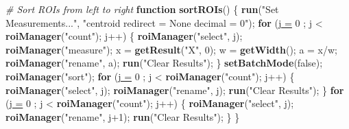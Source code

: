 \documentclass[11pt,singlespacinge,twoside]{reedthesis} %
\newenvironment{Shaded}{}{}
\newcommand{\CommentTok}[1]{\textit{#1}}
\newcommand{\ControlFlowTok}[1]{\textbf{#1}}
\newcommand{\DataTypeTok}[1]{\underline{#1}}
\newcommand{\DecValTok}[1]{#1}
\newcommand{\KeywordTok}[1]{\textbf{#1}}
\newcommand{\NormalTok}[1]{#1}
\newcommand{\OperatorTok}[1]{#1}
\newcommand{\StringTok}[1]{#1}
\theoremstyle{definition}
\theoremstyle{definition}
\theoremstyle{definition}
\theoremstyle{remark}
\begin{document}
\scriptsize
\begin{Shaded}
\begin{Highlighting}[numbers=left,,]
\CommentTok{# Sort ROIs from left to right}
\ControlFlowTok{function} \KeywordTok{sortROIs}\NormalTok{() \{}
    \KeywordTok{run}\NormalTok{(}\StringTok{"Set Measurements..."}\NormalTok{, }\StringTok{"centroid redirect = None decimal = 0"}\NormalTok{);}
            \ControlFlowTok{for}\NormalTok{ (}\DataTypeTok{j =} \DecValTok{0}\NormalTok{ ; j }\OperatorTok{<}\StringTok{ }\KeywordTok{roiManager}\NormalTok{(}\StringTok{"count"}\NormalTok{); j}\OperatorTok{++}\NormalTok{) \{}
                \KeywordTok{roiManager}\NormalTok{(}\StringTok{"select"}\NormalTok{, j);}
                \KeywordTok{roiManager}\NormalTok{(}\StringTok{"measure"}\NormalTok{);}
\NormalTok{                x =}\StringTok{ }\KeywordTok{getResult}\NormalTok{(}\StringTok{"X"}\NormalTok{, }\DecValTok{0}\NormalTok{);}
\NormalTok{                w =}\StringTok{ }\KeywordTok{getWidth}\NormalTok{();}
\NormalTok{                a =}\StringTok{ }\NormalTok{x}\OperatorTok{/}\NormalTok{w;}
                \KeywordTok{roiManager}\NormalTok{(}\StringTok{"rename"}\NormalTok{, a);}
                \KeywordTok{run}\NormalTok{(}\StringTok{"Clear Results"}\NormalTok{);}
\NormalTok{                \}}
        \KeywordTok{setBatchMode}\NormalTok{(false);}
        \KeywordTok{roiManager}\NormalTok{(}\StringTok{"sort"}\NormalTok{); }
            \ControlFlowTok{for}\NormalTok{ (}\DataTypeTok{j =} \DecValTok{0}\NormalTok{ ; j }\OperatorTok{<}\StringTok{ }\KeywordTok{roiManager}\NormalTok{(}\StringTok{"count"}\NormalTok{); j}\OperatorTok{++}\NormalTok{) \{}
                \KeywordTok{roiManager}\NormalTok{(}\StringTok{"select"}\NormalTok{, j);}
                \KeywordTok{roiManager}\NormalTok{(}\StringTok{"rename"}\NormalTok{, j);}
                \KeywordTok{run}\NormalTok{(}\StringTok{"Clear Results"}\NormalTok{);}
\NormalTok{                \}   }
            \ControlFlowTok{for}\NormalTok{ (}\DataTypeTok{j =} \DecValTok{0}\NormalTok{ ; j }\OperatorTok{<}\StringTok{ }\KeywordTok{roiManager}\NormalTok{(}\StringTok{"count"}\NormalTok{); j}\OperatorTok{++}\NormalTok{) \{}
                \KeywordTok{roiManager}\NormalTok{(}\StringTok{"select"}\NormalTok{, j);}
                \KeywordTok{roiManager}\NormalTok{(}\StringTok{"rename"}\NormalTok{, j}\OperatorTok{+}\DecValTok{1}\NormalTok{);}
                \KeywordTok{run}\NormalTok{(}\StringTok{"Clear Results"}\NormalTok{);}
\NormalTok{                \}}
\NormalTok{\}}
\end{Highlighting}
\end{Shaded}
\normalsize
\end{document}
